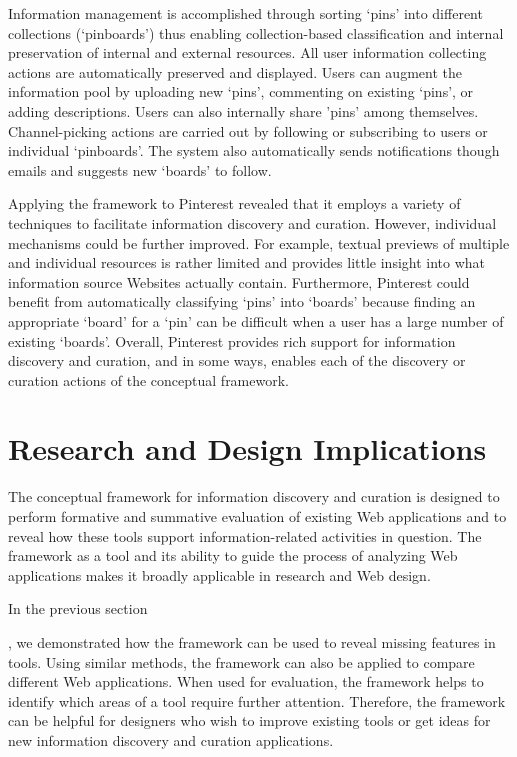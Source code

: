 \documentclass{sigchi}
\newcommand{\feature}[1]{{\ttfamily#1}}
\begin{document}
{{Information management is accomplished through sorting `pins' into different collections (`pinboards') thus enabling \feature{collection-based classification} and \feature{internal preservation of internal and external resources}. All user information collecting actions are \feature{automatically} preserved and displayed. Users can augment the information pool by uploading new `pins', commenting on existing `pins', or adding descriptions. Users can also \feature{internally share} 'pins' among themselves. Channel-picking actions are carried out by following or \feature{subscribing} to users or individual `pinboards'. The system also \feature{automatically} sends \feature{notifications} though emails and \feature{suggests} new `boards' to follow.

Applying the framework to Pinterest revealed that it employs a  variety of techniques to facilitate information discovery and curation. However, individual mechanisms could be further improved. For example, \feature{textual previews} of multiple and individual resources is rather limited and provides little insight into what information source Websites actually contain. Furthermore, Pinterest could benefit from \feature{automatically classifying} `pins' into `boards' because finding an appropriate `board' for a `pin' can be difficult when a user has a large number of existing `boards'. Overall, Pinterest provides rich support for information discovery and curation, and in some ways, enables each of the discovery or curation actions of the conceptual framework. 
} %

\section{Research and Design Implications}
\label{section:implications}
The conceptual framework for information discovery and curation is designed to perform formative and summative evaluation of existing Web applications and to reveal how these tools support information-related activities in question. The framework as a tool and its ability to guide the process of analyzing Web applications makes it broadly applicable in research and Web design. 

In the previous section}, we demonstrated how the framework can be used to reveal missing features in tools. Using similar methods, the framework can also be applied to compare different Web applications. When used for evaluation, the framework helps to identify which areas of a tool require further attention. Therefore, the framework can be helpful for designers who wish to improve existing tools or get ideas for new information discovery and curation applications. 
\end{document}
